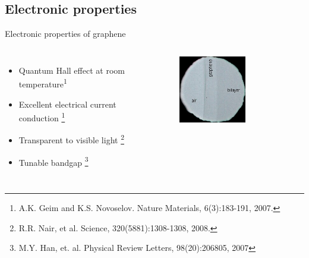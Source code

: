 \documentclass{beamer}
\begin{document}


\subsection{Electronic properties}

\begin{frame}
\vspace{-0.3cm}

\noindent\makebox[\linewidth]{\rule{\linewidth}{0.4pt}}

\vspace{-2.0mm}
\begin{center}
{\huge Electronic properties of graphene}
\end{center}

\vspace{-6mm}
\noindent\makebox[\linewidth]{\rule{\linewidth}{0.4pt}}

\vfill

\begin{columns}
\begin{itemize}

\item Quantum Hall effect at room temperature\textsuperscript{1}

\item Excellent electrical current conduction
\footnote[frame]{\tiny A.K. Geim and K.S. Novoselov. Nature
Materials, 6(3):183-191, 2007.}


\item Transparent to visible light
\footnote[frame]{\tiny R.R. Nair, et al. Science, 320(5881):1308-1308, 2008.}

\item Tunable bandgap
\footnote[frame]{\tiny M.Y. Han, et. al. Physical Review Letters,
98(20):206805, 2007}



\end{itemize}
\begin{figure}
\centering
\includegraphics[width=0.65\textwidth]{figs/trasparency.jpg}


\end{figure}
\end{columns}
\end{frame}
\end{document}
